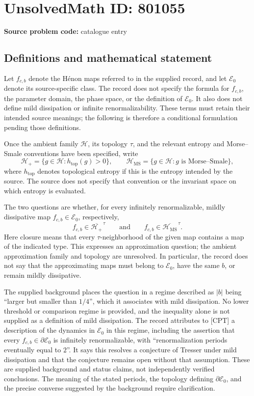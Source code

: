 \documentclass[11pt]{article}
\begin{document}
\section*{UnsolvedMath ID: 801055}
\textbf{Source problem code:} catalogue entry
\subsection{Definitions and mathematical statement}
Let \(f_{c,b}\) denote the Hénon maps referred to in the supplied record, and let \(\mathcal E_0\) denote its source-specific class. The record does not specify the formula for \(f_{c,b}\), the parameter domain, the phase space, or the definition of \(\mathcal E_0\). It also does not define mild dissipation or infinite renormalizability. These terms must retain their intended source meanings; the following is therefore a conditional formulation pending those definitions.

Once the ambient family \(\mathscr H\), its topology \(\tau\), and the relevant entropy and Morse--Smale conventions have been specified, write
\[
\mathscr H_{+}=\{g\in\mathscr H:h_{\mathrm{top}}(g)>0\},
\qquad
\mathscr H_{\mathrm{MS}}=\{g\in\mathscr H:g\text{ is Morse--Smale}\},
\]
where \(h_{\mathrm{top}}\) denotes topological entropy if this is the entropy intended by the source. The source does not specify that convention or the invariant space on which entropy is evaluated.

The two questions are whether, for every infinitely renormalizable, mildly dissipative map \(f_{c,b}\in\mathcal E_0\), respectively,
\[
f_{c,b}\in\overline{\mathscr H_{+}}^{\,\tau}
\qquad\text{and}\qquad
f_{c,b}\in\overline{\mathscr H_{\mathrm{MS}}}^{\,\tau}.
\]
Here closure means that every \(\tau\)-neighborhood of the given map contains a map of the indicated type. This expresses an approximation question; the ambient approximation family and topology are unresolved. In particular, the record does not say that the approximating maps must belong to \(\mathcal E_0\), have the same \(b\), or remain mildly dissipative.

The supplied background places the question in a regime described as \(\lvert b\rvert\) being ``larger but smaller than \(1/4\)'', which it associates with mild dissipation. No lower threshold or comparison regime is provided, and the inequality alone is not supplied as a definition of mild dissipation. The record attributes to [CPT] a description of the dynamics in \(\mathcal E_0\) in this regime, including the assertion that every \(f_{c,b}\in\partial\mathcal E_0\) is infinitely renormalizable, with ``renormalization periods eventually equal to \(2\)''. It says this resolves a conjecture of Tresser under mild dissipation and that the conjecture remains open without that assumption. These are supplied background and status claims, not independently verified conclusions. The meaning of the stated periods, the topology defining \(\partial\mathcal E_0\), and the precise converse suggested by the background require clarification.
\end{document}
